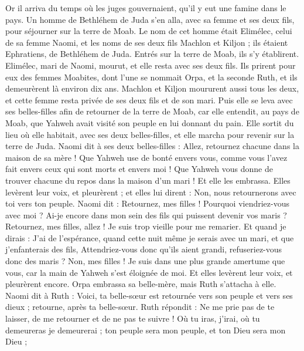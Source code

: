 \begin{multicols}{2}
\VerseOne{}Or il arriva du temps où les juges gouvernaient, qu'il y eut une famine dans le pays. Un homme de Bethléhem de Juda s'en alla, avec sa femme et ses deux fils, pour séjourner sur la terre de Moab.
Le nom de cet homme était Elimélec, celui de sa femme Naomi, et les noms de ses deux fils Machlon et Kiljon ; ils étaient Ephratiens, de Bethléhem de Juda. Entrés sur la terre de Moab, ils s’y établirent.
Elimélec, mari de Naomi, mourut, et elle resta avec ses deux fils.
Ils prirent pour eux des femmes Moabites, dont l'une se nommait Orpa, et la seconde Ruth, et ils demeurèrent là environ dix ans.
Machlon et Kiljon moururent aussi tous les deux, et cette femme resta privée de ses deux fils et de son mari.
Puis elle se leva avec ses belles-filles afin de retourner de la terre de Moab, car elle entendit, au pays de Moab, que Yahweh avait visité son peuple en lui donnant du pain.
Elle sortit du lieu où elle habitait, avec ses deux belles-filles, et elle marcha pour revenir sur la terre de Juda.
Naomi dit à ses deux belles-filles : Allez, retournez chacune dans la maison de sa mère ! Que Yahweh use de bonté envers vous, comme vous l'avez fait envers ceux qui sont morts et envers moi !
Que Yahweh vous donne de trouver chacune du repos dans la maison d'un mari ! Et elle les embrassa. Elles levèrent leur voix, et pleurèrent ;
et elles lui dirent : Non, nous retournerons avec toi vers ton peuple.
Naomi dit : Retournez, mes filles ! Pourquoi viendriez-vous avec moi ? Ai-je encore dans mon sein des fils qui puissent devenir vos maris ?
Retournez, mes filles, allez ! Je suis trop vieille pour me remarier. Et quand je dirais : J'ai de l'espérance, quand cette nuit même je serais avec un mari, et que j'enfanterais des fils,
Attendriez-vous donc qu'ils aient grandi, refuseriez-vous donc des maris ? Non, mes filles ! Je suis dans une plus grande amertume que vous, car la main de Yahweh s'est éloignée de moi.
Et elles levèrent leur voix, et pleurèrent encore. Orpa embrassa sa belle-mère, mais Ruth s’attacha à elle.
Naomi dit à Ruth : Voici, ta belle-sœur est retournée vers son peuple et vers ses dieux ; retourne, après ta belle-sœur.
Ruth répondit : Ne me prie pas de te laisser, de me retourner et de ne pas te suivre ! Où tu iras, j'irai, où tu demeureras je demeurerai ; ton peuple sera mon peuple, et ton Dieu sera mon Dieu ;

\end{multicols}

